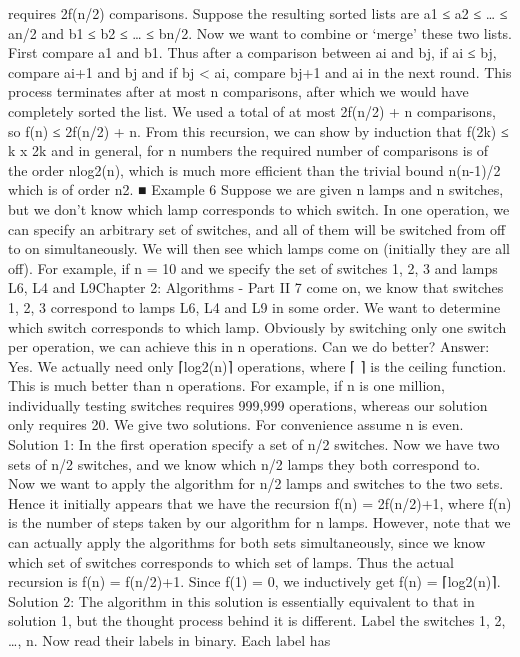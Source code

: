 \documentclass[a4paper,11pt]{book}
\begin{document}
requires 2f(n/2) comparisons. Suppose the resulting sorted lists
are a1 ≤ a2 ≤ … ≤ an/2 and b1 ≤ b2 ≤ … ≤ bn/2. Now we want to
combine or ‘merge’ these two lists. First compare a1 and b1. Thus
after a comparison between ai and bj, if ai ≤ bj, compare ai+1 and bj
and if bj < ai, compare bj+1 and ai in the next round. This process
terminates after at most n comparisons, after which we would
have completely sorted the list. We used a total of at most 2f(n/2)
+ n comparisons, so f(n) ≤ 2f(n/2) + n.
From this recursion, we can show by induction that f(2k) ≤ k x
2k and in general, for n numbers the required number of
comparisons is of the order nlog2(n), which is much more efficient
than the trivial bound n(n-1)/2 which is of order n2. ■
Example 6
Suppose we are given n lamps and n switches, but we don’t know
which lamp corresponds to which switch. In one operation, we
can specify an arbitrary set of switches, and all of them will be
switched from off to on simultaneously. We will then see which
lamps come on (initially they are all off). For example, if n = 10
and we specify the set of switches {1, 2, 3} and lamps L6, L4 and L9Chapter 2: Algorithms - Part II 7
come on, we know that switches {1, 2, 3} correspond to lamps L6,
L4 and L9 in some order. We want to determine which switch
corresponds to which lamp. Obviously by switching only one
switch per operation, we can achieve this in n operations. Can we
do better?
Answer:
Yes. We actually need only ⌈log2(n)⌉ operations, where ⌈ ⌉ is the
ceiling function. This is much better than n operations. For
example, if n is one million, individually testing switches requires
999,999 operations, whereas our solution only requires 20. We
give two solutions. For convenience assume n is even.
Solution 1:
In the first operation specify a set of n/2 switches. Now we have
two sets of n/2 switches, and we know which n/2 lamps they both
correspond to. Now we want to apply the algorithm for n/2 lamps
and switches to the two sets. Hence it initially appears that we
have the recursion f(n) = 2f(n/2)+1, where f(n) is the number of
steps taken by our algorithm for n lamps. However, note that we
can actually apply the algorithms for both sets simultaneously,
since we know which set of switches corresponds to which set of
lamps. Thus the actual recursion is f(n) = f(n/2)+1. Since f(1) = 0,
we inductively get f(n) = ⌈log2(n)⌉.
Solution 2:
The algorithm in this solution is essentially equivalent to that in
solution 1, but the thought process behind it is different. Label the
switches 1, 2, …, n. Now read their labels in binary. Each label has
\end{document}
